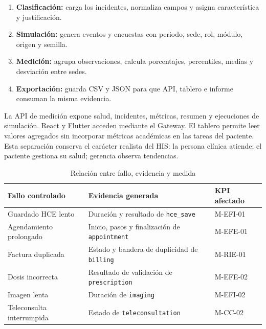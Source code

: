 \begin{enumerate}
  \item \textbf{Clasificación:} carga los incidentes, normaliza campos y asigna característica y justificación.
  \item \textbf{Simulación:} genera eventos y encuestas con periodo, sede, rol, módulo, origen y semilla.
  \item \textbf{Medición:} agrupa observaciones, calcula porcentajes, percentiles, medias y desviación entre sedes.
  \item \textbf{Exportación:} guarda CSV y JSON para que API, tablero e informe consuman la misma evidencia.
\end{enumerate}

La API de medición expone salud, incidentes, métricas, resumen y ejecuciones de simulación. React y Flutter acceden mediante el Gateway. El tablero permite leer valores agregados sin incorporar métricas académicas en las tareas del paciente. Esta separación conserva el carácter realista del HIS: la persona clínica atiende; el paciente gestiona su salud; gerencia observa tendencias.

\begin{table}[H]
\centering
\caption{Relación entre fallo, evidencia y medida}
\begin{tabularx}{\textwidth}{p{3.4cm}YY}
\toprule
Fallo controlado & Evidencia generada & KPI afectado \\
\midrule
Guardado HCE lento & Duración y resultado de \texttt{hce\_save} & M-EFI-01 \\
Agendamiento prolongado & Inicio, pasos y finalización de \texttt{appointment} & M-EFE-01 \\
Factura duplicada & Estado y bandera de duplicidad de \texttt{billing} & M-RIE-01 \\
Dosis incorrecta & Resultado de validación de \texttt{prescription} & M-EFE-02 \\
Imagen lenta & Duración de \texttt{imaging} & M-EFI-02 \\
Teleconsulta interrumpida & Estado de \texttt{teleconsultation} & M-CC-02 \\
\bottomrule
\end{tabularx}
\end{table}

